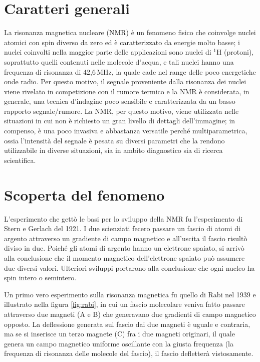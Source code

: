 \documentclass{report}
\newcommand{\figref}[1]{figura \ref{#1}}
\numberwithin{equation}{section}
\numberwithin{figure}{section}
\begin{document}
\section{Caratteri generali}
La risonanza magnetica nucleare (NMR) è un fenomeno fisico che coinvolge nuclei atomici con spin diverso da zero ed è caratterizzato da energie molto basse; i nuclei coinvolti nella maggior parte delle applicazioni sono nuclei di $\mathrm{^1H}$ (protoni), soprattutto quelli contenuti nelle molecole d'acqua, e tali nuclei hanno una frequenza di risonanza di 42,6\,MHz, la quale cade nel range delle poco energetiche onde radio. Per questo motivo, il segnale proveniente dalla risonanza dei nuclei viene rivelato in competizione con il rumore termico e la NMR è considerata, in generale, una tecnica d'indagine poco sensibile e caratterizzata da un basso rapporto segnale/rumore. La NMR, per questo motivo, viene utilizzata nelle situazioni in cui non è richiesto un gran livello di dettagli dell'immagine; in compenso, è una poco invasiva e abbastanza versatile perché multiparametrica, ossia l'intensità del segnale è pesata su diversi parametri che la rendono utilizzabile in diverse situazioni, sia in ambito diagnostico sia di ricerca scientifica.

\section{Scoperta del fenomeno}
L'esperimento che gettò le basi per lo sviluppo della NMR fu l'esperimento di Stern e Gerlach del 1921. I due scienziati fecero passare un fascio di atomi di argento attraverso un gradiente di campo magnetico e all'uscita il fascio risultò diviso in due. Poiché gli atomi di argento hanno un elettrone spaiato, si arrivò alla conclusione che il momento magnetico dell'elettrone spaiato può assumere due diversi valori. Ulteriori sviluppi portarono alla conclusione che ogni nucleo ha spin intero o semintero.

Un primo vero esperimento sulla risonanza magnetica fu quello di Rabi nel 1939 e illustrato nella \figref{fig:rabi}, in cui un fascio molecolare veniva fatto passare attraverso due magneti (A e B) che generavano due gradienti di campo magnetico opposto. La deflessione generata sul fascio dai due magneti è uguale e contraria, ma se si inserisce un terzo magnete (C) fra i due magneti originari, il quale genera un campo magnetico uniforme oscillante con la giusta frequenza (la frequenza di risonanza delle molecole del fascio), il fascio defletterà vistosamente. 
\end{document}
